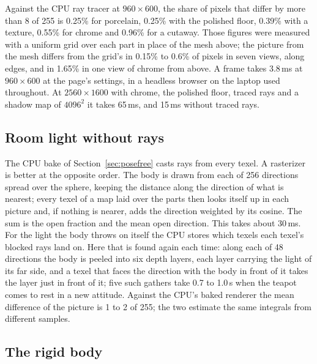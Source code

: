 \documentclass[journal]{IEEEtran}
\begin{document}
Against the CPU ray tracer at $960\times600$, the share of pixels that
differ by more than 8 of 255 is 0.25\% for porcelain, 0.25\% with the
polished floor, 0.39\% with a texture, 0.55\% for chrome and 0.96\% for a
cutaway. Those figures were measured with a uniform grid over each part in place
of the mesh above; the picture from the mesh differs from the grid's in
0.15\% to 0.6\% of pixels in seven views, along edges, and in 1.65\% in
one view of chrome from above. A frame takes 3.8\,ms at $960\times600$
at the page's settings, in a headless browser on the laptop used
throughout. At $2560\times1600$ with chrome, the polished floor, traced
rays and a shadow map of $4096^2$ it takes 65\,ms, and 15\,ms without
traced rays.

\subsection{Room light without rays}

The CPU bake of Section~\ref{sec:posefree} casts rays from every texel.
A rasterizer is better at the opposite order. The body is drawn from
each of 256 directions spread over the sphere, keeping the distance
along the direction of what is nearest; every texel of a map laid over
the parts then looks itself up in each picture and, if nothing is nearer,
adds the direction weighted by its cosine. The sum is the open fraction
and the mean open direction. This takes about 30\,ms. For the light the
body throws on itself the CPU stores which texels each texel's blocked
rays land on. Here that is found again each time: along each of 48
directions the body is peeled into six depth layers, each layer carrying
the light of its far side, and a texel that faces the direction with the
body in front of it takes the layer just in front of it; five such
gathers take 0.7 to 1.0\,s when the teapot comes to rest in a new
attitude. Against the CPU's baked renderer the mean difference of the
picture is 1 to 2 of 255; the two estimate the same integrals from
different samples.

\subsection{The rigid body}
\end{document}
